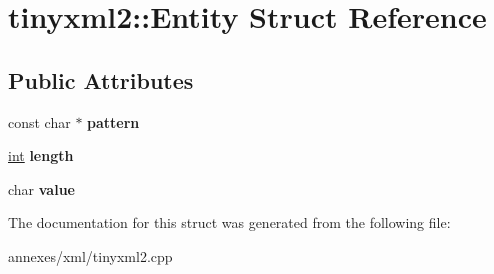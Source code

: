 \hypertarget{structtinyxml2_1_1_entity}{}\section{tinyxml2\+:\+:Entity Struct Reference}
\label{structtinyxml2_1_1_entity}
\subsection*{Public Attributes}
\begin{DoxyCompactItemize}
\item 
\hypertarget{structtinyxml2_1_1_entity_a9b3ad58242779fc20181e612b7c46cce}{}const char $\ast$ {\bfseries pattern}\label{structtinyxml2_1_1_entity_a9b3ad58242779fc20181e612b7c46cce}

\item 
\hypertarget{structtinyxml2_1_1_entity_a25e2b57cb59cb4fa68f283d7cb570f21}{}\hyperlink{_s_d_l__thread_8h_a6a64f9be4433e4de6e2f2f548cf3c08e}{int} {\bfseries length}\label{structtinyxml2_1_1_entity_a25e2b57cb59cb4fa68f283d7cb570f21}

\item 
\hypertarget{structtinyxml2_1_1_entity_a7334e81e33b4615655a403711b24f3ed}{}char {\bfseries value}\label{structtinyxml2_1_1_entity_a7334e81e33b4615655a403711b24f3ed}

\end{DoxyCompactItemize}


The documentation for this struct was generated from the following file\+:\begin{DoxyCompactItemize}
\item 
annexes/xml/tinyxml2.\+cpp\end{DoxyCompactItemize}

